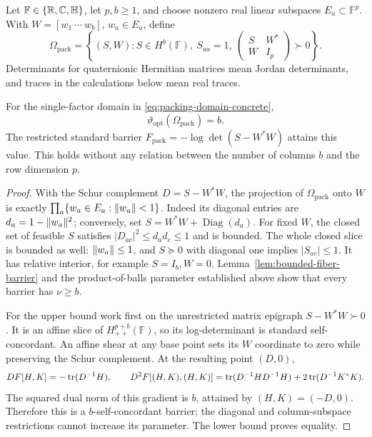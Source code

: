 Let $\mathbb F\in\{\mathbb R,\mathbb C,\mathbb H\}$, let $p,b\geq1$,
and choose nonzero real linear subspaces $E_a\subset\mathbb F^p$.
With $W=[w_1\ \cdots\ w_b]$, $w_a\in E_a$, define
\begin{equation}\label{eq:packing-domain-concrete}
 \Omega_{\mathrm{pack}}
 =\left\{(S,W):S\in H^b(\mathbb F),\ S_{aa}=1,\
       \begin{pmatrix}S&W^*\\W&I_p\end{pmatrix}\succ0\right\}.
\end{equation}
Determinants for quaternionic Hermitian matrices mean Jordan
determinants, and traces in the calculations below mean real traces.

\begin{theorem}\label{thm:packing-intrinsic}
For the single-factor domain in \eqref{eq:packing-domain-concrete},
\begin{equation}\label{eq:packing-intrinsic}
 \vartheta_{\mathrm{opt}}(\Omega_{\mathrm{pack}})=b.
\end{equation}
The restricted standard barrier
$F_{\mathrm{pack}}=-\log\det(S-W^*W)$ attains this value.
This holds without any relation between the number of columns $b$
and the row dimension $p$.
\end{theorem}
\begin{proof}
With the Schur complement $D=S-W^*W$, the projection of
$\Omega_{\mathrm{pack}}$ onto $W$ is exactly
$\prod_a\{w_a\in E_a:\lVert w_a\rVert<1\}$.
Indeed its diagonal entries are $d_a=1-\lVert w_a\rVert^2$;
conversely, set $S=W^*W+\operatorname{Diag}(d_a)$.
For fixed $W$, the closed set of feasible $S$ satisfies
$|D_{ac}|^2\leq d_ad_c\leq1$ and is bounded.
The whole closed slice is bounded as well: $\lVert w_a\rVert\leq1$,
and $S\succeq0$ with diagonal one implies $|S_{ac}|\leq1$.
It has relative interior, for example $S=I_b,W=0$.
Lemma~\ref{lem:bounded-fiber-barrier} and the product-of-balls
parameter established above show that every barrier has $\nu\geq b$.

For the upper bound work first on the unrestricted matrix epigraph
$S-W^*W\succ0$.  It is an affine slice of $H^{p+b}_{++}(\mathbb F)$,
so its log-determinant is standard self-concordant.  An affine shear
at any base point sets its $W$ coordinate to zero while preserving
the Schur complement.  At the resulting point $(D,0)$,
\[
 DF[H,K]=-\operatorname{tr}(D^{-1}H),\qquad
 D^2F[(H,K),(H,K)]
 =\operatorname{tr}(D^{-1}HD^{-1}H)+2\operatorname{tr}(D^{-1}K^*K).
\]
The squared dual norm of this gradient is $b$, attained by
$(H,K)=(-D,0)$.  Therefore this is a $b$-self-concordant barrier;
the diagonal and column-subspace restrictions cannot increase its
parameter.  The lower bound proves equality.
\end{proof}


